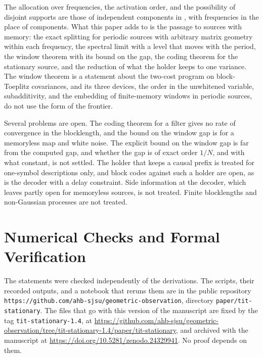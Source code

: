 \documentclass[11pt,onecolumn]{IEEEtran}
\begin{document}
The allocation over frequencies, the activation order, and the
possibility of disjoint supports are those of independent components in
\cite[Theorem~27, Corollary~28]{part1}, with frequencies in the place of
components. What this paper adds to \cite{part1} is the passage to
sources with memory: the exact splitting for periodic sources with
arbitrary matrix geometry within each frequency, the spectral limit
with a level that moves with the period, the window theorem with its
bound on the gap, the coding theorem for the stationary source, and the
reduction of what the holder keeps to one variance. The window theorem
is a statement about the two-cost program on block-Toeplitz
covariances, and its three devices, the order in the unwhitened
variable, subadditivity, and the embedding of finite-memory windows in
periodic sources, do not use the form of the frontier.

Several problems are open. The coding theorem for a filter gives no
rate of convergence in the blocklength, and the bound on the window gap
is for a memoryless map and white noise.
The explicit bound on the window gap is far from the computed
gap, and whether the gap is of exact order $1/N$, and with what
constant, is not settled.
The holder that keeps a causal prefix is treated for
one-symbol descriptions only, and block codes against such a holder are
open, as is the decoder with a delay constraint. Side information at
the decoder, which \cite{part1} leaves partly open for memoryless
sources, is not treated. Finite blocklengths and non-Gaussian processes
are not treated.

\appendices

\section{Numerical Checks and Formal Verification}
\label{app:numver}
\sloppy

The statements were checked independently of the derivations. The
scripts, their recorded outputs, and a notebook that reruns them are in
the public repository
\texttt{https://github.com/ahb-sjsu/geometric-observation}, directory
\texttt{paper/tit-stationary}. The files that go with this version of
the manuscript are fixed by the tag \texttt{tit-stationary-1.4}, at
\url{https://github.com/ahb-sjsu/geometric-observation/tree/tit-stationary-1.4/paper/tit-stationary},
and archived with the manuscript at \url{https://doi.org/10.5281/zenodo.24329941}.
No proof depends on them.
\end{document}
